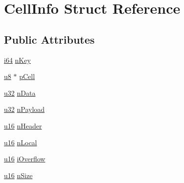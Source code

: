 \hypertarget{struct_cell_info}{\section{Cell\-Info Struct Reference}
\label{struct_cell_info}
}
\subsection*{Public Attributes}
\begin{DoxyCompactItemize}
\item 
\hyperlink{sqlite3_8c_a2a0f0f4ae7001eb54351f77ea1cdbcfd}{i64} \hyperlink{struct_cell_info_a542b041b9a54a13f7c6f2fe63e7542c0}{n\-Key}
\item 
\hyperlink{sqlite3_8c_a74a0f6424ae628af25f23f0a35f6ead3}{u8} $\ast$ \hyperlink{struct_cell_info_a595ed7eeb60ea274d868f24347b7238e}{p\-Cell}
\item 
\hyperlink{sqlite3_8c_a03ad5adfaeb9b7640dde78a0cc390319}{u32} \hyperlink{struct_cell_info_af2301ed16c35633ec6b5d7792734a4bf}{n\-Data}
\item 
\hyperlink{sqlite3_8c_a03ad5adfaeb9b7640dde78a0cc390319}{u32} \hyperlink{struct_cell_info_ac1e3c1b4216a8e778bbac82907bb1485}{n\-Payload}
\item 
\hyperlink{sqlite3_8c_a20f2299e322dcbde37cb07b16910b843}{u16} \hyperlink{struct_cell_info_a99bb1f87208f793359cf63e3d164025b}{n\-Header}
\item 
\hyperlink{sqlite3_8c_a20f2299e322dcbde37cb07b16910b843}{u16} \hyperlink{struct_cell_info_a8cedbcc2c94916fe5798b502c614bb08}{n\-Local}
\item 
\hyperlink{sqlite3_8c_a20f2299e322dcbde37cb07b16910b843}{u16} \hyperlink{struct_cell_info_af7be0161f1c67600aeba783a68972f70}{i\-Overflow}
\item 
\hyperlink{sqlite3_8c_a20f2299e322dcbde37cb07b16910b843}{u16} \hyperlink{struct_cell_info_ace78ab5eb5337b686e31b895feeb0562}{n\-Size}
\end{DoxyCompactItemize}


